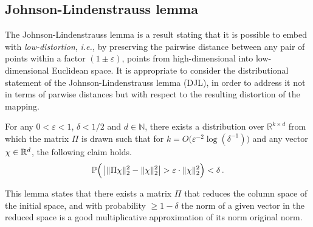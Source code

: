 \appendix
\subsection{Johnson-Lindenstrauss lemma}
\label{ap:jllemma}
The Johnson-Lindenstrauss lemma \cite{jl_transfrom} is a result stating that it is possible to embed
with \textit{low-distortion}, \textit{i.e., } by preserving the pairwise
distance between any pair of points within a factor $(1 \pm \varepsilon)$,
points from high-dimensional into low-dimensional Euclidean space. It is
appropriate to consider the distributional statement of the
Johnson-Lindenstrauss lemma (DJL), in order to address it not in terms of
parwise distances but with respect to the resulting distortion of the mapping.

\begin{lemma}\label{jl-lemma}
For any $0 < \varepsilon < 1$, $\delta < 1/2$ and $d \in \mathbb N$, there
exists a distribution over $\displaystyle \mathbb {R} ^{k\times d}$ from which
the matrix $\Pi$ is drawn such that for $k =
O\big(\varepsilon^{-2}\log(\delta^{-1})\big)$ and any vector $\chi \in \mathbb
R^d$, the following claim holds.
$$
\mathbb P \Big(\left | \| \Pi \chi \|_2^2 - \|\chi\|_2^2 \right | > \varepsilon \cdot \| \chi \| _2^2
\Big)<\delta \, .
$$
\end{lemma}

This lemma states that there exists a matrix $\Pi$ that reduces the column space
of the initial space, and with probability $\geq 1-\delta$ the norm of a given
vector in the reduced space is a good multiplicative approximation of its norm
original norm.

